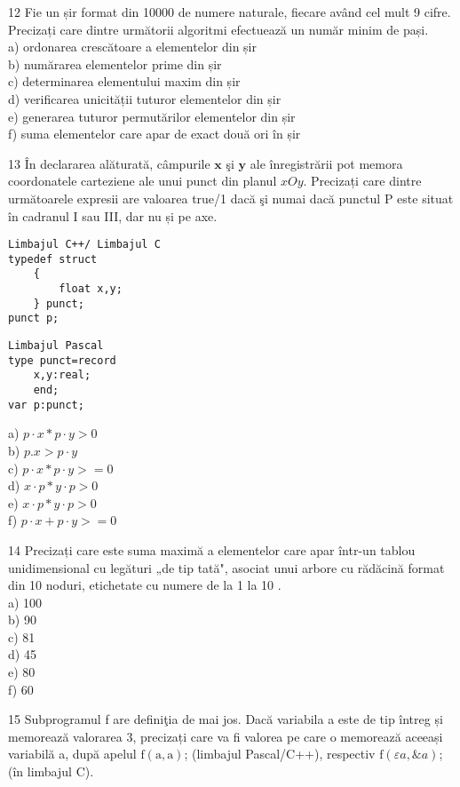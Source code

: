 12 Fie un șir format din 10000 de numere naturale, fiecare având cel mult 9 cifre. Precizați care dintre următorii algoritmi efectuează un număr minim de pași.\\
a) ordonarea crescătoare a elementelor din șir\\
b) numărarea elementelor prime din șir\\
c) determinarea elementului maxim din șir\\
d) verificarea unicității tuturor elementelor din șir\\
e) generarea tuturor permutărilor elementelor din șir\\
f) suma elementelor care apar de exact două ori în șir

13 În declararea alăturată, câmpurile $\mathbf{x}$ şi $\mathbf{y}$ ale înregistrării pot memora coordonatele carteziene ale unui punct din planul $x O y$. Precizați care dintre următoarele expresii are valoarea true/1 dacă şi numai dacă punctul P este situat în cadranul I sau III, dar nu și pe axe.

\begin{verbatim}
Limbajul C++/ Limbajul C
typedef struct
    {
        float x,y;
    } punct;
punct p;
\end{verbatim}

\begin{verbatim}
Limbajul Pascal
type punct=record
    x,y:real;
    end;
var p:punct;
\end{verbatim}

a) $p \cdot x * p \cdot y>0$\\
b) $p . x>p \cdot y$\\
c) $p \cdot x * p \cdot y>=0$\\
d) $x \cdot p * y \cdot p>0$\\
e) $x \cdot p * y \cdot p>0$\\
f) $p \cdot x+p \cdot y>=0$

14 Precizați care este suma maximă a elementelor care apar într-un tablou unidimensional cu legături „de tip tată", asociat unui arbore cu rădăcină format din 10 noduri, etichetate cu numere de la 1 la 10 .\\
a) 100\\
b) 90\\
c) 81\\
d) 45\\
e) 80\\
f) 60

15 Subprogramul f are definiţia de mai jos. Dacă variabila a este de tip întreg și memorează valorarea 3, precizați care va fi valorea pe care o memorează aceeași variabilă a, după apelul $\mathrm{f}(\mathrm{a}, \mathrm{a})$; (limbajul Pascal/C++), respectiv $\mathrm{f}(\varepsilon a, \& a)$; (în limbajul C).

